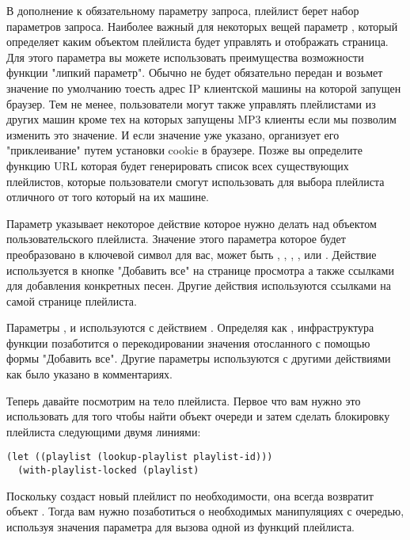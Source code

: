 В дополнение к обязательному параметру запроса, плейлист берет набор параметров запроса.
Наиболее важный для некоторых вещей параметр , который определяет каким
объектом плейлиста будет управлять и отображать страница. Для этого параметра вы можете
использовать преимущества возможности функции  "липкий
параметр". Обычно  не будет обязательно передан и возьмет значение по
умолчанию тоесть адрес IP клиентской машины на которой запущен браузер. Тем не менее,
пользователи могут также управлять плейлистами из других машин кроме тех на которых
запущены MP3 клиенты если мы позволим изменить это значение. И если значение уже указано,
 организует его "приклеивание" путем установки cookie в
браузере. Позже вы определите функцию URL которая будет генерировать список всех
существующих плейлистов, которые пользователи смогут использовать для выбора плейлиста
отличного от того который на их машине.

Параметр  указывает некоторое действие которое нужно делать над объектом
пользовательского плейлиста. Значение этого параметра которое будет преобразовано в
ключевой символ для вас, может быть , ,
, ,  или . Действие
 используется в кнопке "Добавить все" на странице просмотра а также
ссылками для добавления конкретных песен. Другие действия используются ссылками на самой
странице плейлиста.

Параметры ,  и  используются с действием
. Определяя  как , инфраструктура функции
 позаботится о перекодировании значения отосланного с помощью
формы "Добавить все". Другие параметры используются с другими действиями как было указано
в комментариях.

Теперь давайте посмотрим на тело плейлиста. Первое что вам нужно это использовать
 для того чтобы найти объект очереди и затем сделать блокировку
плейлиста следующими двумя линиями:

\begin{lstlisting}
(let ((playlist (lookup-playlist playlist-id)))
  (with-playlist-locked (playlist)
\end{lstlisting}

Поскольку  создаст новый плейлист по необходимости, она всегда
возвратит объект . Тогда вам нужно позаботиться о необходимых манипуляциях
с очередью, используя значения параметра  для вызова одной из функций
плейлиста.


